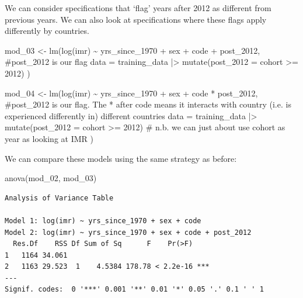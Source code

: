\documentclass[
  letterpaper,
  DIV=11,
  numbers=noendperiod]{scrartcl}
\newenvironment{Shaded}{\begin{snugshade}}{\end{snugshade}}
\newcommand{\AttributeTok}[1]{\textcolor[rgb]{0.40,0.45,0.13}{#1}}
\newcommand{\CommentTok}[1]{\textcolor[rgb]{0.37,0.37,0.37}{#1}}
\newcommand{\DecValTok}[1]{\textcolor[rgb]{0.68,0.00,0.00}{#1}}
\newcommand{\FunctionTok}[1]{\textcolor[rgb]{0.28,0.35,0.67}{#1}}
\newcommand{\NormalTok}[1]{\textcolor[rgb]{0.00,0.23,0.31}{#1}}
\newcommand{\OtherTok}[1]{\textcolor[rgb]{0.00,0.23,0.31}{#1}}
\newcommand{\SpecialCharTok}[1]{\textcolor[rgb]{0.37,0.37,0.37}{#1}}
\begin{document}
We can consider specifications that `flag' years after 2012 as different
from previous years. We can also look at specifications where these
flags apply differently by countries.

\begin{Shaded}
\begin{Highlighting}[]
\NormalTok{mod\_03 }\OtherTok{\textless{}{-}} \FunctionTok{lm}\NormalTok{(}\FunctionTok{log}\NormalTok{(imr) }\SpecialCharTok{\textasciitilde{}}\NormalTok{ yrs\_since\_1970 }\SpecialCharTok{+}\NormalTok{ sex }\SpecialCharTok{+}\NormalTok{ code }\SpecialCharTok{+}\NormalTok{ post\_2012, }
             \CommentTok{\#post\_2012 is our \textquotesingle{}flag\textquotesingle{}}
             \AttributeTok{data =}\NormalTok{ training\_data }\SpecialCharTok{|\textgreater{}} 
               \FunctionTok{mutate}\NormalTok{(}\AttributeTok{post\_2012 =}\NormalTok{ cohort }\SpecialCharTok{\textgreater{}=} \DecValTok{2012}\NormalTok{)}
\NormalTok{          )}

\NormalTok{mod\_04 }\OtherTok{\textless{}{-}} \FunctionTok{lm}\NormalTok{(}\FunctionTok{log}\NormalTok{(imr) }\SpecialCharTok{\textasciitilde{}}\NormalTok{ yrs\_since\_1970 }\SpecialCharTok{+}\NormalTok{ sex }\SpecialCharTok{+}\NormalTok{ code }\SpecialCharTok{*}\NormalTok{ post\_2012, }
             \CommentTok{\#post\_2012 is our \textquotesingle{}flag\textquotesingle{}. The * after code means it interacts with country (i.e. is experienced differently in) different countries}
             \AttributeTok{data =}\NormalTok{ training\_data }\SpecialCharTok{|\textgreater{}} 
               \FunctionTok{mutate}\NormalTok{(}\AttributeTok{post\_2012 =}\NormalTok{ cohort }\SpecialCharTok{\textgreater{}=} \DecValTok{2012}\NormalTok{)}
             \CommentTok{\# n.b. we can just about use cohort as year as looking at IMR}
\NormalTok{          )}
\end{Highlighting}
\end{Shaded}

We can compare these models using the same strategy as before:

\begin{Shaded}
\begin{Highlighting}[]
\FunctionTok{anova}\NormalTok{(mod\_02, mod\_03)}
\end{Highlighting}
\end{Shaded}

\begin{verbatim}
Analysis of Variance Table

Model 1: log(imr) ~ yrs_since_1970 + sex + code
Model 2: log(imr) ~ yrs_since_1970 + sex + code + post_2012
  Res.Df    RSS Df Sum of Sq      F    Pr(>F)    
1   1164 34.061                                  
2   1163 29.523  1    4.5384 178.78 < 2.2e-16 ***
---
Signif. codes:  0 '***' 0.001 '**' 0.01 '*' 0.05 '.' 0.1 ' ' 1
\end{verbatim}
\end{document}
